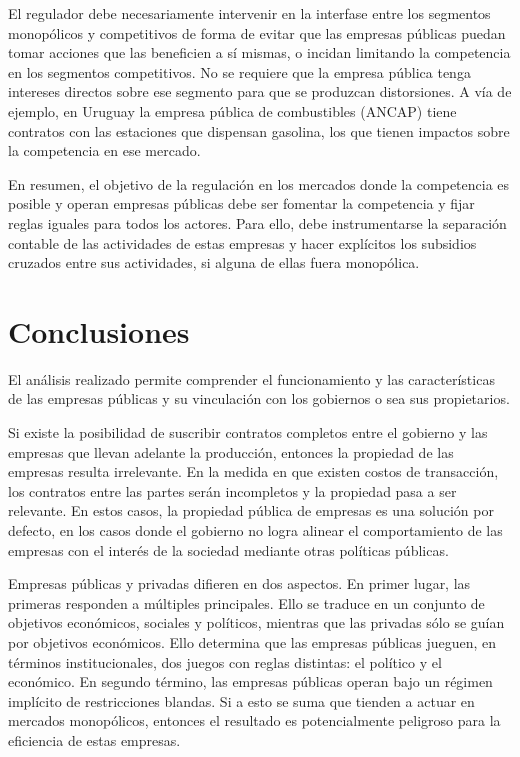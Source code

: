\documentclass[
  12pt,
  spanish,
]{book}
\begin{document}
El regulador debe necesariamente intervenir en la interfase entre los segmentos monopólicos y competitivos de forma de evitar que las empresas públicas puedan tomar acciones que las beneficien a sí mismas, o incidan limitando la competencia en los segmentos competitivos. No se requiere que la empresa pública tenga intereses directos sobre ese segmento para que se produzcan distorsiones. A vía de ejemplo, en Uruguay la empresa pública de combustibles (ANCAP) tiene contratos con las estaciones que dispensan gasolina, los que tienen impactos sobre la competencia en ese mercado.

En resumen, el objetivo de la regulación en los mercados donde la competencia es posible y operan empresas públicas debe ser fomentar la competencia y fijar reglas iguales para todos los actores. Para ello, debe instrumentarse la separación contable de las actividades de estas empresas y hacer explícitos los subsidios cruzados entre sus actividades, si alguna de ellas fuera monopólica.

\hypertarget{conclusiones}{%
\section{Conclusiones}\label{conclusiones}}

El análisis realizado permite comprender el funcionamiento y las características de las empresas públicas y su vinculación con los gobiernos o sea sus propietarios.

Si existe la posibilidad de suscribir contratos completos entre el gobierno y las empresas que llevan adelante la producción, entonces la propiedad de las empresas resulta irrelevante. En la medida en que existen costos de transacción, los contratos entre las partes serán incompletos y la propiedad pasa a ser relevante. En estos casos, la propiedad pública de empresas es una solución por defecto, en los casos donde el gobierno no logra alinear el comportamiento de las empresas con el interés de la sociedad mediante otras políticas públicas.

Empresas públicas y privadas difieren en dos aspectos. En primer lugar, las primeras responden a múltiples principales. Ello se traduce en un conjunto de objetivos económicos, sociales y políticos, mientras que las privadas sólo se guían por objetivos económicos. Ello determina que las empresas públicas jueguen, en términos institucionales, dos juegos con reglas distintas: el político y el económico. En segundo término, las empresas públicas operan bajo un régimen implícito de restricciones blandas. Si a esto se suma que tienden a actuar en mercados monopólicos, entonces el resultado es potencialmente peligroso para la eficiencia de estas empresas.
\end{document}
